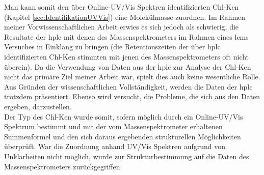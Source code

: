 Man kann somit den über Online-UV/Vis Spektren identifizierten \gls{Chl-K}en (Kapitel \ref{sec:IdentifikationUVVis}) eine Molekülmasse zuordnen. Im Rahmen meiner Vorwissenschaftlichen Arbeit erwies es sich jedoch als schwierig, die Resultate der \gls{hplc} mit denen des Massenspektrometers im Rahmen eines \gls{lcms} Versuches in Einklang zu bringen (die Retentionszeiten der über \gls{hplc} identifizierten \gls{Chl-K}en stimmten mit jenen des Massenspektrometers oft nicht überein). Da die Verwendung von Daten aus der \gls{hplc} zur Analyse der \gls{Chl-K}en nicht das primäre Ziel meiner Arbeit war, spielt dies auch keine wesentliche Rolle. Aus Gründen der wissenschaftlichen Vollständigkeit, werden die Daten der \gls{hplc} trotzdem präsentiert. Ebenso wird versucht, die Probleme, die sich aus den Daten ergeben, darzustellen.\\

Der Typ des \gls{Chl-K}en wurde somit, sofern möglich durch ein Online-UV/Vis Spektrum bestimmt und mit der vom Massenspektrometer erhaltenen Summenformel und den sich daraus ergebenden strukturellen Möglichkeiten überprüft. War die Zuordnung anhand UV/Vis Spektren aufgrund von Unklarheiten nicht möglich, wurde zur Strukturbestimmung auf die Daten des Massenspektrometers zurückgegriffen.\\



